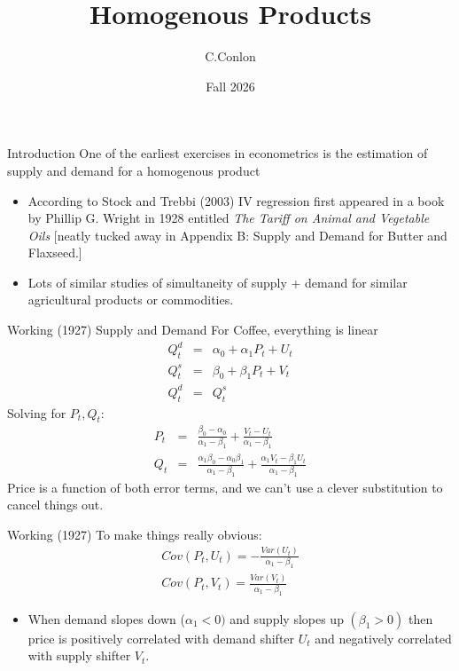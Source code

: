\documentclass[aspectratio=169,11pt]{beamer}
\title [Homogenous Products]{Homogenous Products}
\author{C.Conlon}
\institute{Grad IO }
\date{Fall 2026}
\begin{document}
\begin{frame}
\titlepage
\end{frame}

\begin{frame}{Introduction}
One of the earliest exercises in econometrics is the estimation of supply and demand for a homogenous product
\begin{itemize}
\item According to Stock and Trebbi (2003) IV regression first appeared in a book by Phillip G. Wright in 1928 entitled \textit{The Tariff on Animal and Vegetable Oils} [neatly tucked away in Appendix B:  Supply and Demand for Butter and Flaxseed.]
\item Lots of similar studies of simultaneity of supply + demand for similar agricultural products or commodities.
\end{itemize}
\end{frame}

\begin{frame}{Working (1927)}
Supply and Demand For Coffee, everything is linear
\begin{eqnarray*}
Q_t^d &=& \alpha_0 + \alpha_1 P_t + U_t\\
Q_t^s &=& \beta_0 + \beta_1 P_t + V_t\\
Q_t^d &=& Q_t^s
\end{eqnarray*}
Solving for $P_t,Q_t$:
\begin{eqnarray*}
P_t &=& \frac{\beta_0 - \alpha_0}{\alpha_1 - \beta_1} + \frac{V_t - U_t}{\alpha_1 - \beta_1}\\
Q_t &=& \frac{\alpha_1 \beta_0 - \alpha_0 \beta_1}{\alpha_1 - \beta_1} + \frac{\alpha_1 V_t - \beta_1 U_t}{\alpha_1 - \beta_1}
\end{eqnarray*}
Price is a function of both error terms, and we can't use a clever substitution to cancel things out.
\end{frame}

\begin{frame}{Working (1927)}
To make things really obvious:
\begin{eqnarray*}
Cov(P_t,U_t) = - \frac{Var(U_t)}{\alpha_1 -\beta_1} \\
Cov(P_t,V_t) =  \frac{Var(V_t)}{\alpha_1 -\beta_1} 
\end{eqnarray*}
\begin{itemize}
\item When demand slopes down ($\alpha_1 < 0)$ and supply slopes up $(\beta_1 > 0)$ then price is positively correlated with demand shifter $U_t$ and negatively correlated with supply shifter $V_t$.
\end{itemize}
\end{frame}
\end{document}

